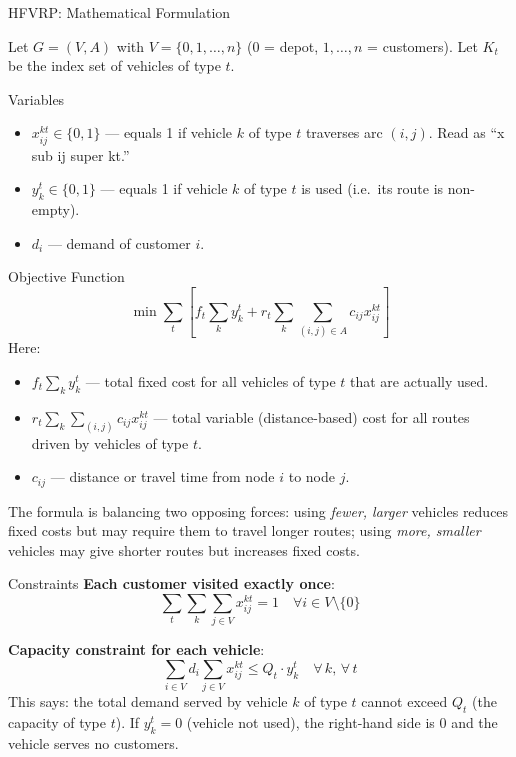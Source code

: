 \documentclass[aspectratio=169,10pt]{beamer}
\begin{document}
\begin{frame}[allowframebreaks]{HFVRP: Mathematical Formulation}

Let $G = (V, A)$ with $V = \{0,1,\ldots,n\}$ (0 = depot, $1,\ldots,n$ =
customers).  Let $K_t$ be the index set of vehicles of type $t$.

\begin{block}{Variables}
  \begin{itemize}
    \item $x_{ij}^{kt} \in \{0,1\}$ --- equals 1 if vehicle $k$ of type $t$
          traverses arc $(i,j)$.  Read as ``x sub ij super kt.''
    \item $y_k^t \in \{0,1\}$ --- equals 1 if vehicle $k$ of type $t$ is
          used (i.e.\ its route is non-empty).
    \item $d_i$ --- demand of customer $i$.
  \end{itemize}
\end{block}

\begin{block}{Objective Function}
  \[
    \min \sum_t \left[ f_t \sum_k y_k^t
        + r_t \sum_k \sum_{(i,j) \in A} c_{ij} x_{ij}^{kt} \right]
  \]
  Here:
  \begin{itemize}
    \item $f_t \sum_k y_k^t$ --- total fixed cost for all vehicles of type $t$
          that are actually used.
    \item $r_t \sum_k \sum_{(i,j)} c_{ij} x_{ij}^{kt}$ --- total variable
          (distance-based) cost for all routes driven by vehicles of type $t$.
    \item $c_{ij}$ --- distance or travel time from node $i$ to node $j$.
  \end{itemize}

  The formula is balancing two opposing forces: using \emph{fewer, larger}
  vehicles reduces fixed costs but may require them to travel longer routes;
  using \emph{more, smaller} vehicles may give shorter routes but increases
  fixed costs.
\end{block}

\framebreak

\begin{block}{Constraints}
  \textbf{Each customer visited exactly once}:
  \[
    \sum_t \sum_k \sum_{j \in V} x_{ij}^{kt} = 1 \quad \forall i \in V \setminus \{0\}
  \]

  \textbf{Capacity constraint for each vehicle}:
  \[
    \sum_{i \in V} d_i \sum_{j \in V} x_{ij}^{kt} \leq Q_t \cdot y_k^t
    \quad \forall\, k,\, \forall\, t
  \]
  This says: the total demand served by vehicle $k$ of type $t$ cannot
  exceed $Q_t$ (the capacity of type $t$).  If $y_k^t = 0$ (vehicle not used),
  the right-hand side is 0 and the vehicle serves no customers.


\end{block}
\end{frame}
\end{document}
